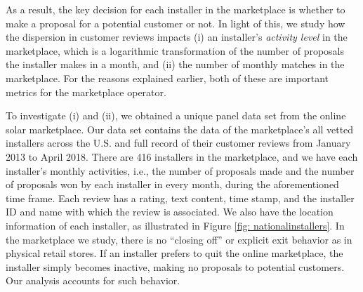 \documentclass[mnsc,blindrev]{informs3}
\begin{document}
%	
%	
	
	As a result, the key decision for each installer in the marketplace is whether to make a proposal for a potential customer or not. In light of this, we study how the dispersion in customer reviews impacts (i) an installer's \emph{activity level} in the marketplace, which is a logarithmic transformation of the number of proposals the installer makes in a month, and (ii) the number of monthly matches in the marketplace. For the reasons explained earlier, both of these are important metrics for the marketplace operator.
	
	
	
	To investigate (i) and (ii), we obtained a unique panel data set from the online solar marketplace. Our data set contains the data of the marketplace's all vetted installers across the U.S. and full record of their customer reviews from January 2013 to April 2018. There are 416 installers in the marketplace, and we have each installer's monthly activities, i.e., the number of proposals made and the number of proposals won by each installer in every month, during the aforementioned time frame. Each review has a rating, text content, time stamp, and the installer ID and name with which the review is associated. We also have the location information of each installer, as illustrated in Figure \ref{fig: nationalinstallers}. In the marketplace we study, there is no ``closing off'' or explicit exit behavior as in physical retail stores. If an installer prefers to quit the online marketplace, the installer simply becomes inactive, making no proposals to potential customers. Our analysis accounts for such behavior.
	
	
	
	
\end{document}

